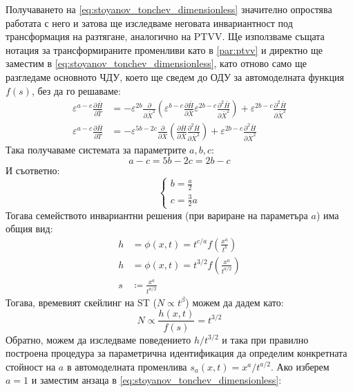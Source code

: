 Получаването на \autoref{eq:stoyanov_tonchev_dimensionless} значително опростява работата с него и затова ще изследваме неговата инвариантност под трансформация на разтягане, аналогично на PTVV. Ще използваме същата нотация за трансформираните променливи като в \autoref{par:ptvv} и директно ще заместим в \autoref{eq:stoyanov_tonchev_dimensionless}, като отново само ще разгледаме основното ЧДУ, което ще сведем до ОДУ за автомоделната функция $f(s)$, без да го решаваме:
\begin{align*}
    {\varepsilon ^{a - c}}\frac{{\partial \bar H}}{{\partial \bar T}} &=  - {\varepsilon ^{2b}}\frac{\partial }{{\partial {{\bar X}^2}}}\left( {{\varepsilon ^{b - c}}\frac{{\partial \bar H}}{{\partial \bar X}}{\varepsilon ^{2b - c}}\frac{{{\partial ^2}\bar H}}{{\partial {{\bar X}^2}}}} \right) + {\varepsilon ^{2b - c}}\frac{{{\partial ^2}\bar H}}{{\partial {{\bar X}^2}}} \\
    {\varepsilon ^{a - c}}\frac{{\partial \bar H}}{{\partial \bar T}} &=  - {\varepsilon ^{5b - 2c}}\frac{\partial }{{\partial \bar X}}\left( {\frac{{\partial \bar H}}{{\partial \bar X}}\frac{{{\partial ^2}\bar H}}{{\partial {{\bar X}^2}}}} \right) + {\varepsilon ^{2b - c}}\frac{{{\partial ^2}\bar H}}{{\partial {{\bar X}^2}}}
\end{align*}
Така получаваме системата за параметрите $a, b, c$:
\begin{equation*}
    a - c = 5b - 2c = 2b - c
\end{equation*}
И съответно:
\begin{equation}
    \begin{cases}
        b = \frac{a}{2} \\
        c = \frac{3}{2} a
    \end{cases} 
\end{equation}
Тогава семейството инвариантни решения (при вариране на параметъра $a$) има общия вид:
\begin{align*}
    h &= \phi (x,t) = {t^{c/a}}f\left( {\frac{{{x^a}}}{{{t^b}}}} \right) \\
    h &= \phi (x,t) = {t^{3/2}}f\left( {\frac{{{x^a}}}{{{t^{a/2}}}}} \right) \\
    s &\coloneqq \frac{x^a}{t^{a/2}}
\end{align*}
Тогава, времевият скейлинг на ST ($N \propto t^\beta$) можем да дадем като:
\begin{equation}
    N \propto \frac{h(x,t)}{f(s)} = t^{3/2}
\end{equation}
Обратно, можем да изследваме поведението $h/t^{3/2}$ и така при правилно построена процедура за параметрична идентификация да определим конкретната стойност на $a$ в автомоделната променлива $s_a(x,t) = x^a/t^{a/2}$. Ако изберем $a = 1$ и заместим анзаца в \autoref{eq:stoyanov_tonchev_dimensionless}:
